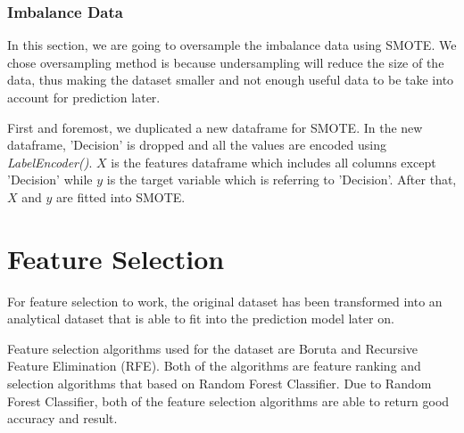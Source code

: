 \documentclass[11pt]{article}
\begin{document}
\subsubsection{Imbalance Data}
In this section, we are going to oversample the imbalance data using SMOTE. We chose oversampling method is because undersampling will reduce the size of the data, thus making the dataset smaller and not enough useful data to be take into account for prediction later. 

First and foremost, we duplicated a new dataframe for SMOTE. In the new dataframe, 'Decision' is dropped and all the values are encoded using \textit{LabelEncoder()}. $X$ is the features dataframe which includes all columns except 'Decision' while $y$ is the target variable which is referring to 'Decision'. After that, $X$ and $y$ are fitted into SMOTE. 

\section{Feature Selection}
For feature selection to work, the original dataset has been transformed into an analytical dataset that is able to fit into the prediction model later on. 

Feature selection algorithms used for the dataset are Boruta and Recursive Feature Elimination (RFE). Both of the algorithms are feature ranking and selection algorithms that based on Random Forest Classifier. Due to Random Forest Classifier, both of the feature selection algorithms are able to return good accuracy and result. 
\end{document}
